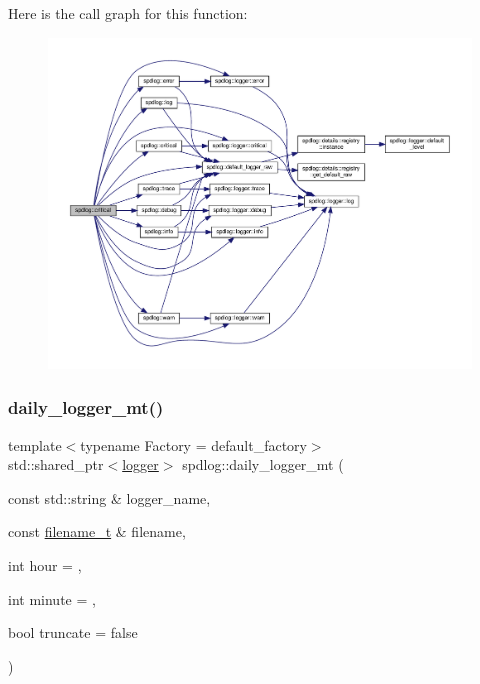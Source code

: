 Here is the call graph for this function\+:
\nopagebreak
\begin{figure}[H]
\begin{center}
\leavevmode
\includegraphics[width=350pt]{namespacespdlog_a2c707fb3d3d12a244ebfe3e40b417edc_cgraph}
\end{center}
\end{figure}
\mbox{\label{namespacespdlog_aeab720351e32788bc6cdf8ada42b0f1f}} 
\subsubsection{\texorpdfstring{daily\+\_\+logger\+\_\+mt()}{daily\_logger\_mt()}}
{\footnotesize\ttfamily template$<$typename Factory  = default\+\_\+factory$>$ \\
std\+::shared\+\_\+ptr$<$\hyperlink{classspdlog_1_1logger}{logger}$>$ spdlog\+::daily\+\_\+logger\+\_\+mt (\begin{DoxyParamCaption}\item[{const std\+::string \&}]{logger\+\_\+name,  }\item[{const \hyperlink{namespacespdlog_acf7ce125b3622e44f8f1702d699e0b06}{filename\+\_\+t} \&}]{filename,  }\item[{int}]{hour = {},  }\item[{int}]{minute = {},  }\item[{bool}]{truncate = {\ttfamily false} }\end{DoxyParamCaption})\hspace{0.3cm}{\ttfamily [inline]}}



